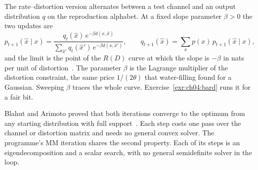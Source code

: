The rate--distortion version alternates between a test channel and an output distribution $q$ on the reproduction alphabet. At a fixed slope parameter $\beta>0$ the two updates are
\begin{equation}\label{eq:ch04:ba-rd}
p_{t+1}(\hat x\mid x)=\frac{q_t(\hat x)\,e^{-\beta d(x,\hat x)}}{\sum_{\hat x'}q_t(\hat x')\,e^{-\beta d(x,\hat x')}},\qquad
q_{t+1}(\hat x)=\sum_xp(x)\,p_{t+1}(\hat x\mid x),
\end{equation}
and the limit is the point of the $R(D)$ curve at which the slope is $-\beta$ in nats per unit of distortion~\cite{blahut1972}. The parameter $\beta$ is the Lagrange multiplier of the distortion constraint, the same price $1/(2\theta)$ that water-filling found for a Gaussian. Sweeping $\beta$ traces the whole curve. Exercise~\ref{exr:ch04:bard} runs it for a fair bit.

Blahut and Arimoto proved that both iterations converge to the optimum from any starting distribution with full support~\cite{blahut1972,arimoto1972}. Each step costs one pass over the channel or distortion matrix and needs no general convex solver. The programme's MM iteration shares the second property. Each of its steps is an eigendecomposition and a scalar search, with no general semidefinite solver in the loop.


